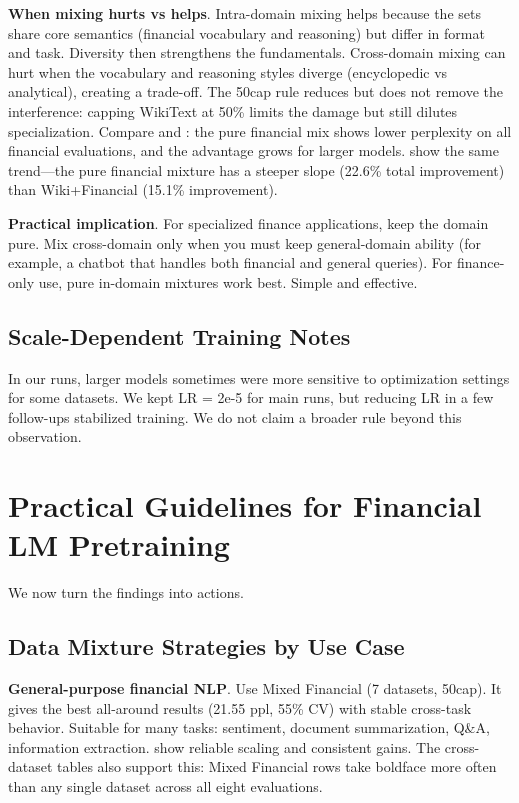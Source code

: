 \textbf{When mixing hurts vs helps}. Intra-domain mixing helps because the sets share core semantics (financial vocabulary and reasoning) but differ in format and task. Diversity then strengthens the fundamentals. Cross-domain mixing can hurt when the vocabulary and reasoning styles diverge (encyclopedic vs analytical), creating a trade-off. The 50cap rule reduces but does not remove the interference: capping WikiText at 50\% limits the damage but still dilutes specialization. Compare  and : the pure financial mix shows lower perplexity on all financial evaluations, and the advantage grows for larger models.  show the same trend—the pure financial mixture has a steeper slope (22.6\% total improvement) than Wiki+Financial (15.1\% improvement).

\textbf{Practical implication}. For specialized finance applications, keep the domain pure. Mix cross-domain only when you must keep general-domain ability (for example, a chatbot that handles both financial and general queries). For finance-only use, pure in-domain mixtures work best. Simple and effective.

\subsection{Scale-Dependent Training Notes}

In our runs, larger models sometimes were more sensitive to optimization settings for some datasets. We kept LR = 2e-5 for main runs, but reducing LR in a few follow-ups stabilized training. We do not claim a broader rule beyond this observation.

\section{Practical Guidelines for Financial LM Pretraining}

We now turn the findings into actions.

\subsection{Data Mixture Strategies by Use Case}

\textbf{General-purpose financial NLP}. Use Mixed Financial (7 datasets, 50cap). It gives the best all-around results (21.55 ppl, 55\% CV) with stable cross-task behavior. Suitable for many tasks: sentiment, document summarization, Q\&A, information extraction.  show reliable scaling and consistent gains. The cross-dataset tables also support this: Mixed Financial rows take boldface more often than any single dataset across all eight evaluations.

